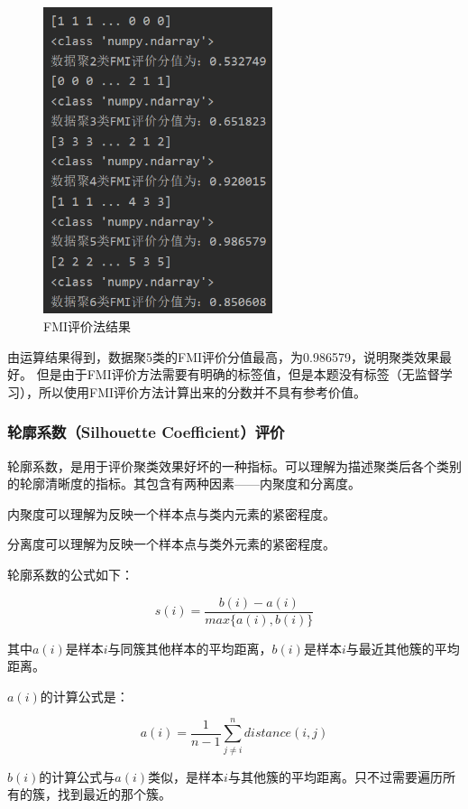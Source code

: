 \documentclass[UTF8,12pt]{article}
\begin{document}
\begin{figure}[htbp]
    \centering
    \includegraphics[width=0.6\textwidth]{img/11.png}
    \caption{FMI评价法结果}
\end{figure}


由运算结果得到，数据聚5类的FMI评价分值最高，为0.986579，说明聚类效果最好。
但是由于FMI评价方法需要有明确的标签值，但是本题没有标签（无监督学习），所以使用FMI评价方法计算出来的分数并不具有参考价值。

\subsubsection{轮廓系数（Silhouette Coefficient）评价}
轮廓系数，是用于评价聚类效果好坏的一种指标。可以理解为描述聚类后各个类别的轮廓清晰度的指标。其包含有两种因素——内聚度和分离度。

内聚度可以理解为反映一个样本点与类内元素的紧密程度。

分离度可以理解为反映一个样本点与类外元素的紧密程度。

轮廓系数的公式如下：

$$s(i)=\frac{b(i)-a(i)}{max\{a(i),b(i)\}}$$

其中$a(i)$是样本$i$与同簇其他样本的平均距离，$b(i)$是样本$i$与最近其他簇的平均距离。

$a(i)$的计算公式是：

$$a(i)=\frac{1}{n-1} \sum_{j \neq i}^n distance(i,j)$$

$b(i)$的计算公式与$a(i)$类似，是样本$i$与其他簇的平均距离。只不过需要遍历所有的簇，找到最近的那个簇。
\end{document}
